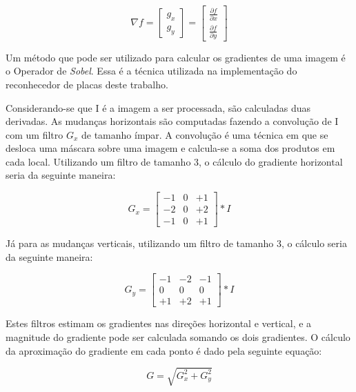 \begin{displaymath}
\nabla f={\begin{bmatrix}g_{x}\\g_{y}\end{bmatrix}}={\begin{bmatrix}{\frac {\partial f}{\partial x}}\\{\frac {\partial f}{\partial y}}\end{bmatrix}}
\end{displaymath}

Um método que pode ser utilizado para calcular os gradientes de uma imagem é o
Operador de \emph{Sobel}. Essa é a técnica utilizada na implementação do
reconhecedor de placas deste trabalho.

Considerando-se que I é a imagem a ser processada, são calculadas duas
derivadas. As mudanças horizontais são computadas fazendo a convolução de I com
um filtro $G_{x}$ de tamanho ímpar. A convolução é uma técnica em que se desloca
uma máscara sobre uma imagem e calcula-se a soma dos produtos em cada local.
Utilizando um filtro de tamanho 3, o cálculo do gradiente horizontal seria da
seguinte maneira:

\begin{displaymath}
G_{x} = \begin{bmatrix}
-1 & 0 & +1  \\
-2 & 0 & +2  \\
-1 & 0 & +1
\end{bmatrix} * I
\end{displaymath}

Já para as mudanças verticais, utilizando um filtro de tamanho 3, o cálculo
seria da seguinte maneira:

\begin{displaymath}
G_{y} = \begin{bmatrix}
-1 & -2 & -1  \\
0 & 0 & 0  \\
+1 & +2 & +1
\end{bmatrix} * I
\end{displaymath}

Estes filtros estimam os gradientes nas direções horizontal e vertical, e a
magnitude do gradiente pode ser calculada somando os dois gradientes. O cálculo
da aproximação do gradiente em cada ponto é dado pela seguinte equação:

\begin{displaymath}
	G = \sqrt{G_{x}^{2} + G_{y}^{2}}
\end{displaymath}


